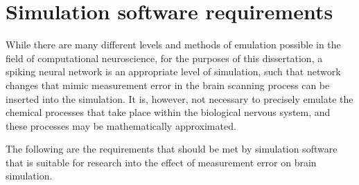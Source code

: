 \section{Simulation software requirements}
\label{SimulationRequirements}

While there are many different levels and methods of emulation possible in the
field of computational neuroscience, for the purposes of this dissertation, a
spiking neural network is an appropriate level of simulation, such that network
changes that mimic measurement error in the brain scanning process can be
inserted into the simulation. It is, however, not necessary to precisely emulate
the chemical processes that take place within the biological nervous system, and
these processes may be mathematically approximated.

The following are the requirements that should be met by simulation software
that is suitable for research into the effect of measurement error on brain
simulation.

